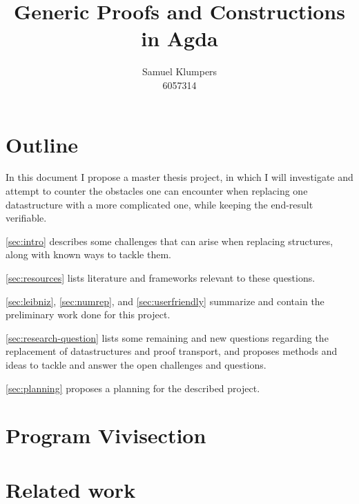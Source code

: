 \documentclass{article}
\title{Generic Proofs and Constructions in Agda}
\author{Samuel Klumpers\\6057314}
\theoremstyle{plain}%
\theoremstyle{definition}
\begin{document}
\maketitle


\begin{comment}
\begin{abstract} %
    This thesis introduces the concepts of the structure identity principle, numerical representations, and ornamentations, and aims to combine these to simplify the presentation and verification of finger trees, demonstrating the generalizability and improved compactness and security of the resulting code. 
\end{abstract}
\end{comment}

\section*{Outline}
In this document I propose a master thesis project, in which I will investigate and attempt to counter the obstacles one can encounter when replacing one datastructure with a more complicated one, while keeping the end-result verifiable.

\autoref{sec:intro} describes some challenges that can arise when replacing structures, along with known ways to tackle them.

\autoref{sec:resources} lists literature and frameworks relevant to these questions.

\autoref{sec:leibniz}, \autoref{sec:numrep}, and \autoref{sec:userfriendly} summarize and contain the preliminary work done for this project.

\autoref{sec:research-question} lists some remaining and new questions regarding the replacement of datastructures and proof transport, and proposes methods and ideas to tackle and answer the open challenges and questions.

\autoref{sec:planning} proposes a planning for the described project.


\section{Program Vivisection}\label{sec:intro}



\section{Related work}\label{sec:resources}
\end{document}
